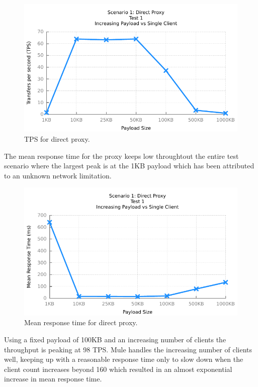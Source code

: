 \begin{figure}[htpb]
	\centerline{\includegraphics{img/proxy_fu_ip_tps}}
	\caption{TPS for direct proxy.}
	\label{fig:proxy-1-1}
\end{figure}

The mean response time for the proxy keeps low throughtout the entire test scenario where the largest peak is at the 1KB payload which has been attributed to an unknown network limitation.

\begin{figure}[htpb]
	\centerline{\includegraphics{img/proxy_fu_ip_resp}}
	\caption{Mean response time for direct proxy.}
	\label{fig:proxy-1-2}
\end{figure}

Using a fixed payload of 100KB and an increasing number of clients the throughput is peaking at 98 TPS. Mule handles the increasing number of clients well, keeping up with a reasonable response time only to slow down when the client count increases beyond 160 which resulted in an almost exponential increase in mean response time.

